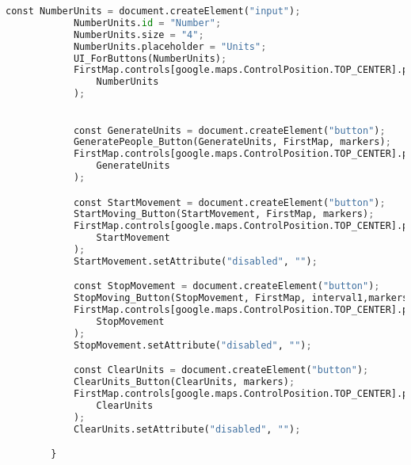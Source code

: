 \documentclass[a4paper]{article}
\begin{document}
\begin{lstlisting}[language=python,tabsize = 1,breaklines=true, breakatwhitespace=false,frame=single]
			const NumberUnits = document.createElement("input");
			NumberUnits.id = "Number";
			NumberUnits.size = "4";
			NumberUnits.placeholder = "Units";
			UI_ForButtons(NumberUnits);
			FirstMap.controls[google.maps.ControlPosition.TOP_CENTER].push(
				NumberUnits
			);
			

			const GenerateUnits = document.createElement("button");
			GeneratePeople_Button(GenerateUnits, FirstMap, markers);
			FirstMap.controls[google.maps.ControlPosition.TOP_CENTER].push(
				GenerateUnits
			);

			const StartMovement = document.createElement("button");
			StartMoving_Button(StartMovement, FirstMap, markers);
			FirstMap.controls[google.maps.ControlPosition.TOP_CENTER].push(
				StartMovement
			);
			StartMovement.setAttribute("disabled", "");

			const StopMovement = document.createElement("button");
			StopMoving_Button(StopMovement, FirstMap, interval1,markers);
			FirstMap.controls[google.maps.ControlPosition.TOP_CENTER].push(
				StopMovement
			);
			StopMovement.setAttribute("disabled", "");

			const ClearUnits = document.createElement("button");
			ClearUnits_Button(ClearUnits, markers);
			FirstMap.controls[google.maps.ControlPosition.TOP_CENTER].push(
				ClearUnits
			);
			ClearUnits.setAttribute("disabled", "");

		}
		
\end{lstlisting}
\end{document}
